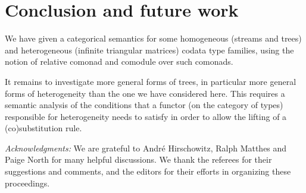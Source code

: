 \documentclass[a4paper,USenglish]{lipics}
\begin{document}
\section{Conclusion and future work}

We have given a categorical semantics for some homogeneous (streams and trees) and heterogeneous (infinite triangular matrices) codata type families,
using the notion of relative comonad and comodule over such comonads.

It remains to investigate more general forms of trees, in particular more general forms of heterogeneity than the one we have
considered here.
This requires a semantic analysis of the conditions that a functor (on the category of types) responsible for heterogeneity needs to satisfy in order to allow the lifting of a (co)substitution rule.

 \textit{Acknowledgments:}
 We are grateful to André Hirschowitz, Ralph Matthes and Paige North for many helpful discussions.
 We thank the referees for their suggestions and comments, and the editors for their efforts in organizing these proceedings.
 


\end{document}
